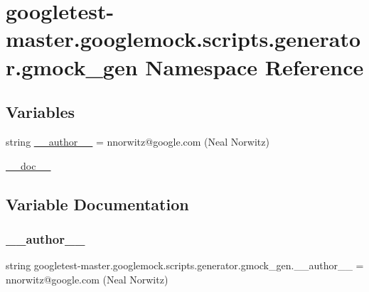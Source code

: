 \hypertarget{namespacegoogletest-master_1_1googlemock_1_1scripts_1_1generator_1_1gmock__gen}{}\section{googletest-\/master.googlemock.\+scripts.\+generator.\+gmock\+\_\+gen Namespace Reference}
\label{namespacegoogletest-master_1_1googlemock_1_1scripts_1_1generator_1_1gmock__gen}
\subsection*{Variables}
\begin{DoxyCompactItemize}
\item 
string \mbox{\hyperlink{namespacegoogletest-master_1_1googlemock_1_1scripts_1_1generator_1_1gmock__gen_a3337671edd4d81071da746c9511a7764}{\+\_\+\+\_\+author\+\_\+\+\_\+}} = \textquotesingle{}nnorwitz@google.\+com (Neal Norwitz)\textquotesingle{}
\item 
\mbox{\hyperlink{namespacegoogletest-master_1_1googlemock_1_1scripts_1_1generator_1_1gmock__gen_a60fb9ddea489583bfe1f07b544ada033}{\+\_\+\+\_\+doc\+\_\+\+\_\+}}
\end{DoxyCompactItemize}


\subsection{Variable Documentation}
\mbox{\label{namespacegoogletest-master_1_1googlemock_1_1scripts_1_1generator_1_1gmock__gen_a3337671edd4d81071da746c9511a7764}} 
\subsubsection{\texorpdfstring{\_\_author\_\_}{\_\_author\_\_}}
{\footnotesize\ttfamily string googletest-\/master.\+googlemock.\+scripts.\+generator.\+gmock\+\_\+gen.\+\_\+\+\_\+author\+\_\+\+\_\+ = \textquotesingle{}nnorwitz@google.\+com (Neal Norwitz)\textquotesingle{}\hspace{0.3cm}{\ttfamily [private]}}

